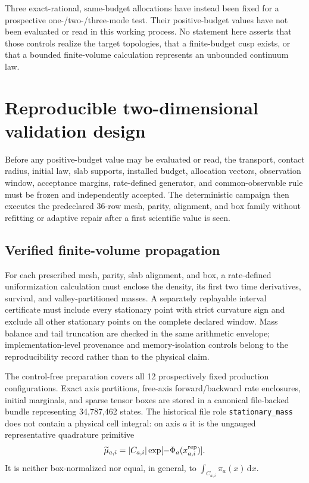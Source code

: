 \documentclass[aps,physrev,reprint,amsmath,amssymb,longbibliography,floatfix]{revtex4-2}
\newcommand{\dd}{\mathrm d}
\begin{document}
Three exact-rational, same-budget allocations have instead been fixed for a
prospective one-/two-/three-mode test.  Their positive-budget values have not
been evaluated or read in this working process.  No statement here asserts
that those controls realize the
target topologies, that a finite-budget cusp exists, or that a bounded
finite-volume calculation represents an unbounded continuum law.

\section{Reproducible two-dimensional validation design}
\label{sec:validation-design}

Before any positive-budget value may be evaluated or read, the transport,
contact radius, initial law, slab supports, installed budget, allocation
vectors, observation window, acceptance margins, rate-defined generator, and
common-observable rule must be frozen and independently accepted.  The
deterministic campaign then executes the predeclared 36-row mesh, parity,
alignment, and box family without refitting or adaptive repair after a first
scientific value is seen.

\subsection{Verified finite-volume propagation}

For each prescribed mesh, parity, slab alignment, and box, a rate-defined
uniformization calculation must enclose the density, its first two time
derivatives, survival, and valley-partitioned masses.  A separately replayable
interval certificate must include every stationary point with strict curvature
sign and exclude all other stationary points on the complete declared window.
Mass balance and tail truncation are checked in the same arithmetic envelope;
implementation-level provenance and memory-isolation controls belong to the
reproducibility record rather than to the physical claim.

The control-free preparation covers all 12 prospectively fixed production
configurations.  Exact axis partitions, free-axis forward/backward rate
enclosures, initial marginals, and sparse tensor boxes are stored in a
canonical file-backed bundle representing 34,787,462 states.  The historical
file role \texttt{stationary\_mass} does not contain a physical cell integral:
on axis \(a\) it is the ungauged representative quadrature primitive
\[
 \widetilde\mu_{a,i}
 =|C_{a,i}|\exp[-\Phi_a(x_{a,i}^{\rm rep})].
\]
It is neither box-normalized nor equal, in general, to
\(\int_{C_{a,i}}\pi_a(x)\,\dd x\).
\end{document}
